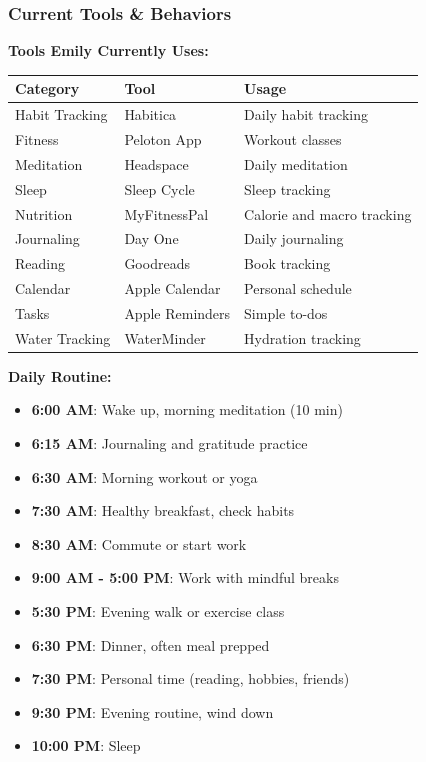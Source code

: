 \subsubsection{Current Tools \& Behaviors}

\textbf{Tools Emily Currently Uses:}

\begin{table}[H]
\centering
\begin{tabular}{|l|l|p{6cm}|}
\hline
\rowcolor{lightgray}
\textbf{Category} & \textbf{Tool} & \textbf{Usage} \\
\hline
Habit Tracking & Habitica & Daily habit tracking \\
\hline
Fitness & Peloton App & Workout classes \\
\hline
Meditation & Headspace & Daily meditation \\
\hline
Sleep & Sleep Cycle & Sleep tracking \\
\hline
Nutrition & MyFitnessPal & Calorie and macro tracking \\
\hline
Journaling & Day One & Daily journaling \\
\hline
Reading & Goodreads & Book tracking \\
\hline
Calendar & Apple Calendar & Personal schedule \\
\hline
Tasks & Apple Reminders & Simple to-dos \\
\hline
Water Tracking & WaterMinder & Hydration tracking \\
\hline
\end{tabular}
\end{table}

\textbf{Daily Routine:}

\begin{itemize}
    \item \textbf{6:00 AM}: Wake up, morning meditation (10 min)
    \item \textbf{6:15 AM}: Journaling and gratitude practice
    \item \textbf{6:30 AM}: Morning workout or yoga
    \item \textbf{7:30 AM}: Healthy breakfast, check habits
    \item \textbf{8:30 AM}: Commute or start work
    \item \textbf{9:00 AM - 5:00 PM}: Work with mindful breaks
    \item \textbf{5:30 PM}: Evening walk or exercise class
    \item \textbf{6:30 PM}: Dinner, often meal prepped
    \item \textbf{7:30 PM}: Personal time (reading, hobbies, friends)
    \item \textbf{9:30 PM}: Evening routine, wind down
    \item \textbf{10:00 PM}: Sleep
\end{itemize}

